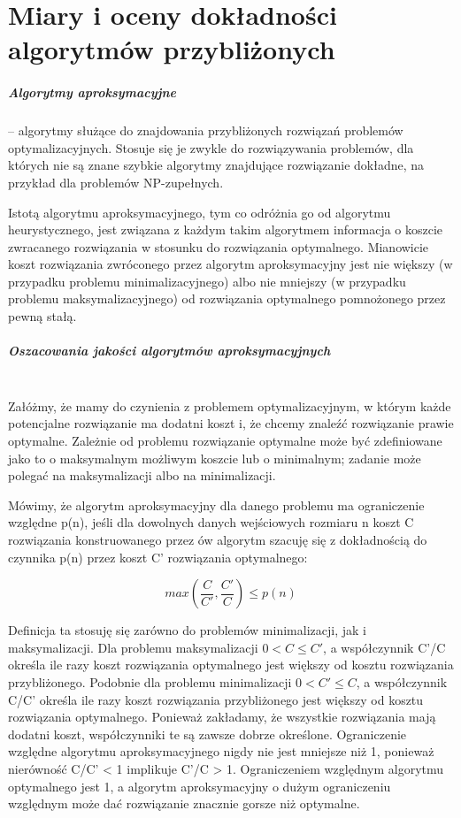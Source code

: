 \documentclass[a4paper,twoside]{report}
\begin{document}
\chapter{Miary i oceny dokładności algorytmów przybliżonych}

\paragraph{Algorytmy aproksymacyjne} – algorytmy służące do znajdowania przybliżonych rozwiązań problemów optymalizacyjnych. Stosuje się je zwykle do rozwiązywania problemów, dla których nie są znane szybkie algorytmy znajdujące rozwiązanie dokładne, na przykład dla problemów NP-zupełnych.


Istotą algorytmu aproksymacyjnego, tym co odróżnia go od algorytmu heurystycznego, jest związana z każdym takim algorytmem informacja o koszcie zwracanego rozwiązania w stosunku do rozwiązania optymalnego. Mianowicie koszt rozwiązania zwróconego przez algorytm aproksymacyjny jest nie większy (w przypadku problemu minimalizacyjnego) albo nie mniejszy (w przypadku problemu maksymalizacyjnego) od rozwiązania optymalnego pomnożonego przez pewną stałą.

\paragraph{Oszacowania jakości algorytmów aproksymacyjnych\\\\}

Załóżmy, że mamy do czynienia z problemem optymalizacyjnym, w którym każde potencjalne rozwiązanie ma dodatni koszt i, że chcemy znaleźć rozwiązanie prawie optymalne. Zależnie od problemu rozwiązanie optymalne może być zdefiniowane jako to o maksymalnym możliwym koszcie lub o minimalnym; zadanie może polegać na maksymalizacji albo na minimalizacji.


Mówimy, że algorytm aproksymacyjny dla danego problemu ma ograniczenie względne p(n), jeśli dla dowolnych danych wejściowych rozmiaru n koszt C rozwiązania konstruowanego przez ów algorytm szacuję się z dokładnością do czynnika p(n) przez koszt C' rozwiązania optymalnego:

$$ max(\frac{C}{C'},\frac{C'}{C}) \le p(n) $$


Definicja ta stosuję się zarówno do problemów minimalizacji, jak i maksymalizacji. Dla problemu maksymalizacji $ 0 < C \le C' $, a współczynnik C'/C określa ile razy koszt rozwiązania optymalnego jest większy od kosztu rozwiązania przybliżonego. Podobnie dla problemu minimalizacji $ 0 < C' \le C$, a współczynnik C/C' określa ile razy koszt rozwiązania przybliżonego jest większy od kosztu rozwiązania optymalnego. Ponieważ zakładamy, że wszystkie rozwiązania mają dodatni koszt, współczynniki te są zawsze dobrze określone. Ograniczenie względne algorytmu aproksymacyjnego nigdy nie jest mniejsze niż 1, ponieważ nierówność C/C' < 1 implikuje C'/C > 1. Ograniczeniem względnym algorytmu optymalnego jest 1, a algorytm aproksymacyjny o dużym ograniczeniu względnym może dać rozwiązanie znacznie gorsze niż optymalne.
\end{document}
